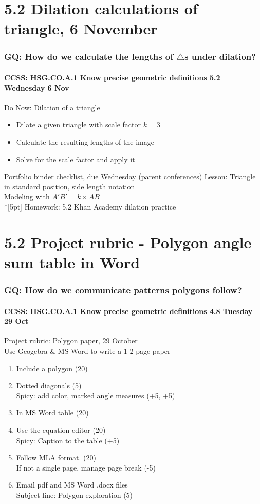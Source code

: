 \documentclass{beamer}
\begin{document}
  \section{5.2 Dilation calculations of triangle, 6 November}
  \frame
  {
    \frametitle{GQ: How do we calculate the lengths of $\triangle$s under dilation?}
    \framesubtitle{CCSS: HSG.CO.A.1 Know precise geometric definitions \hfill \alert{5.2 Wednesday 6 Nov}}
  
    \begin{block}{Do Now: Dilation of a triangle}
    \begin{itemize}
      \item Dilate a given triangle with scale factor $k=3$
      \item Calculate the resulting lengths of the image
      \item Solve for the scale factor and apply it
    \end{itemize}
    \end{block}
    Portfolio binder checklist, due Wednesday (parent conferences)
    Lesson: Triangle in standard position, side length notation \\
    Modeling with $A'B'=k \times AB$ \\*[5pt]
    Homework: 5.2 Khan Academy dilation practice
  }

\section{5.2 Project rubric - Polygon angle sum table in Word}
\frame
{
\frametitle{GQ: How do we communicate patterns polygons follow?}
\framesubtitle{CCSS: HSG.CO.A.1 Know precise geometric definitions \hfill \alert{4.8 Tuesday 29 Oct}}

\begin{block}{Project rubric: Polygon paper, 29 October\\ Use Geogebra \& MS Word to write a 1-2 page paper}
\begin{enumerate} 
  \item Include a polygon (20)
  \item Dotted diagonals (5)\\
  Spicy: add color, marked angle measures (+5, +5)
  \item In MS Word table (20) 
  \item Use the equation editor (20) \\
  Spicy: Caption to the table (+5)
  \item Follow MLA format. (20) \\
  If not a single page, manage page break (-5)
  \item Email pdf and MS Word .docx files\\
  Subject line: Polygon exploration (5) 
\end{enumerate}
\end{block}
}
\end{document}
